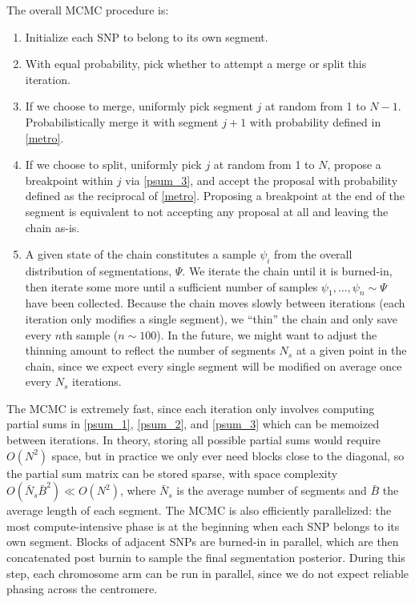 \documentclass[10pt,letter]{article}
\numberwithin{equation}{section}
\begin{document}
The overall MCMC procedure is:
\begin{enumerate}
\item Initialize each SNP to belong to its own segment.
\item With equal probability, pick whether to attempt a merge or split this iteration.
\item If we choose to merge, uniformly pick segment $j$ at random from 1 to $N-1$. Probabilistically merge it with segment $j+1$ with probability defined in \eqref{metro}.
\item If we choose to split, uniformly pick $j$ at random from 1 to $N$, propose a breakpoint within $j$ via \eqref{psum_3}, and accept the proposal with probability defined as the reciprocal of \eqref{metro}. Proposing a breakpoint at the end of the segment is equivalent to not accepting any proposal at all and leaving the chain as-is.
\item A given state of the chain constitutes a sample $\psi_i$ from the overall distribution of segmentations, $\Psi$. We iterate the chain until it is burned-in, then iterate some more until a sufficient number of samples $\psi_1,\dots,\psi_n\sim\Psi$ have been collected. Because the chain moves slowly between iterations (each iteration only modifies a single segment), we ``thin'' the chain and only save every $n$th sample ($n\sim 100$). In the future, we might want to adjust the thinning amount to reflect the number of segments $N_s$ at a given point in the chain, since we expect every single segment will be modified on average once every $N_s$ iterations.
\end{enumerate}

The MCMC is extremely fast, since each iteration only involves computing partial sums in \eqref{psum_1}, \eqref{psum_2}, and \eqref{psum_3} which can be memoized between iterations. In theory, storing all possible partial sums would require $O(N^2)$ space, but in practice we only ever need blocks close to the diagonal, so the partial sum matrix can be stored sparse, with space complexity $O(\bar{N}_s\bar{B}^2)\ll O(N^2)$, where $\bar{N}_s$ is the average number of segments and $\bar{B}$ the average length of each segment. The MCMC is also efficiently parallelized: the most compute-intensive phase is at the beginning when each SNP belongs to its own segment. Blocks of adjacent SNPs are burned-in in parallel, which are then concatenated post burnin to sample the final segmentation posterior. During this step, each chromosome arm can be run in parallel, since we do not expect reliable phasing across the centromere.
\end{document}
